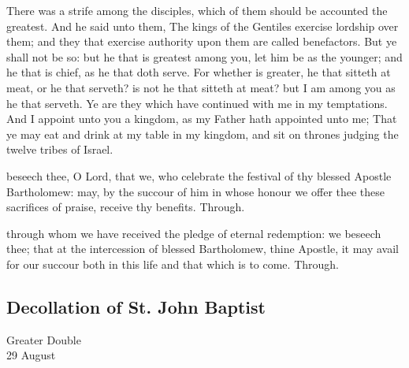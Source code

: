
\vspace{-0.25\baselineskip}

 There was a strife among the disciples, which of them should be accounted the greatest. And he said unto them, The kings of the Gentiles exercise lordship over them; and they that exercise authority upon them are called benefactors. But ye shall not be so: but he that is greatest among you, let him be as the younger; and he that is chief, as he that doth serve. For whether is greater, he that sitteth at meat, or he that serveth? is not he that sitteth at meat? but I am among you as he that serveth. Ye are they which have continued with me in my temptations. And I appoint unto you a kingdom, as my Father hath appointed unto me; That ye may eat and drink at my table in my kingdom, and sit on thrones judging the twelve tribes of Israel.


\vspace{-0.25\baselineskip}

\secret
{} beseech thee, O Lord, that we, who celebrate the festival of thy blessed Apostle Bartholomew: may, by the succour of him in whose honour we offer thee these sacrifices of praise, receive thy benefits. Through.

\vspace{-0.25\baselineskip}


\vspace{-0.25\baselineskip}

\postcommunion
{} through whom we have received the pledge of eternal redemption: we beseech thee; that at the intercession of blessed Bartholomew, thine Apostle, it may avail for our succour both in this life and that which is to come. Through.


\clearpage
\subsection{Decollation of St. John Baptist}
\begin{inhead}
    {Greater Double\\
29 August}
\end{inhead}


